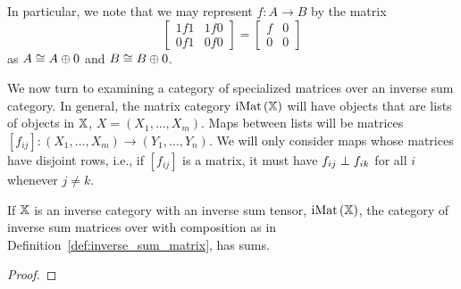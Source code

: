 In particular, we note that we may represent $f:A\to B$ by the matrix
\[
  \begin{bmatrix}
    1f1& 1f 0 \\ 0 f 1 & 0 f 0
  \end{bmatrix}
  =
  \begin{bmatrix}
    f& 0 \\ 0 & 0
  \end{bmatrix}
\]
as $A \cong A\oplus0$ and $B \cong B\oplus0$.

We now turn to examining a category of specialized matrices over an inverse sum category. In
general, the
matrix category $\operatorname{iMat}{(\mathbb{X})}$ will have objects that are lists of objects in $\mathbb{X}$,
$X=(X_1,\ldots,X_m)$. Maps between lists will be matrices $[f_{i j}]: (X_1,\ldots,X_m) \to
(Y_1,\ldots,Y_n)$. We will only consider maps whose matrices have disjoint rows, i.e., if
$[f_{i j}]$ is a matrix, it must have $f_{i j} \perp f_{i k}$ for all $i$ whenever $j \ne k$.




\begin{lemma}\label{lem:inverse_sums_means_mat_x_has_coproducts}
  If $\mathbb{X}$ is an inverse category with an inverse sum tensor, $\operatorname{iMat}{(\mathbb{X})}$, the category of
  inverse sum matrices over \X with composition as in Definition~\ref{def:inverse_sum_matrix},
  has sums.
\end{lemma}
\begin{proof}


\end{proof}










%
%
%

